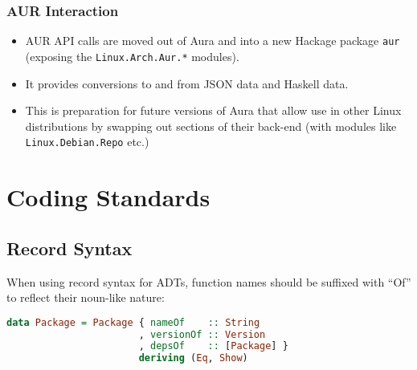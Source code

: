 \documentclass{article}
\begin{document}
\subsubsection{AUR Interaction}\label{aur-interaction}

\begin{itemize}
\itemsep1pt\parskip0pt
\item
  AUR API calls are moved out of Aura and into a new Hackage package
  \texttt{aur} (exposing the \texttt{Linux.Arch.Aur.*} modules).
\item
  It provides conversions to and from JSON data and Haskell data.
\item
  This is preparation for future versions of Aura that allow use in
  other Linux distributions by swapping out sections of their back-end
  (with modules like \texttt{Linux.Debian.Repo} etc.)
\end{itemize}

\section{Coding Standards}\label{coding-standards}

\subsection{Record Syntax}\label{record-syntax}

When using record syntax for ADTs, function names should be suffixed
with ``Of'' to reflect their noun-like nature:

\begin{shaded}
\begin{lstlisting}[language=haskell]
data Package = Package { nameOf    :: String
                       , versionOf :: Version
                       , depsOf    :: [Package] }
                       deriving (Eq, Show)
\end{lstlisting}
\end{shaded}
\end{document}
